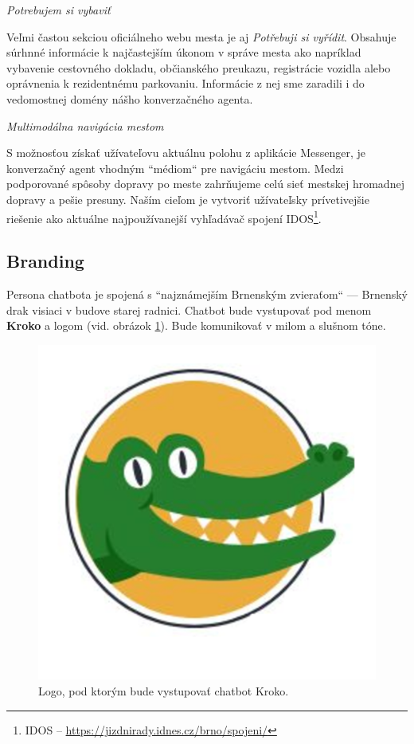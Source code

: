 \documentclass{ExcelAtFIT}
\begin{document}
\vspace{2mm}
\textit{Potrebujem si vybaviť}

\noindent Veľmi častou sekciou oficiálneho webu mesta je aj \emph{Potřebuji si vyřídit}. Obsahuje súrhnné informácie k najčastejším úkonom v správe mesta ako napríklad vybavenie cestovného dokladu, občianského preukazu, registrácie vozidla alebo oprávnenia k rezidentnému parkovaniu. Informácie z nej sme zaradili i do vedomostnej domény nášho konverzačného agenta.


\newpage
\textit{Multimodálna navigácia mestom}

\noindent S možnosťou získať užívateľovu aktuálnu polohu z aplikácie Messenger, je konverzačný agent vhodným ``médiom`` pre navigáciu mestom. Medzi podporované spôsoby dopravy po meste zahrňujeme celú sieť mestskej hromadnej dopravy a pešie presuny. Naším cieľom je vytvoriť užívateľsky prívetivejšie riešenie ako aktuálne najpoužívanejší vyhľadávač spojení IDOS\footnote{IDOS -- \url{https://jizdnirady.idnes.cz/brno/spojeni/}}.

\subsection{Branding}
Persona chatbota je spojená s ``najznámejším Brnenským zvieraťom`` --- Brnenský drak visiaci v budove starej radnici. Chatbot bude vystupovať pod menom \textbf{Kroko} a logom (vid. obrázok \ref{kroko}). Bude komunikovať v milom a slušnom tóne.

\begin{figure}[h]
	\centering
	\includegraphics[width=0.5\linewidth]{resized2.png}
	\caption{Logo, pod ktorým bude vystupovať chatbot Kroko.}
	\label{kroko}
\end{figure}
\end{document}
